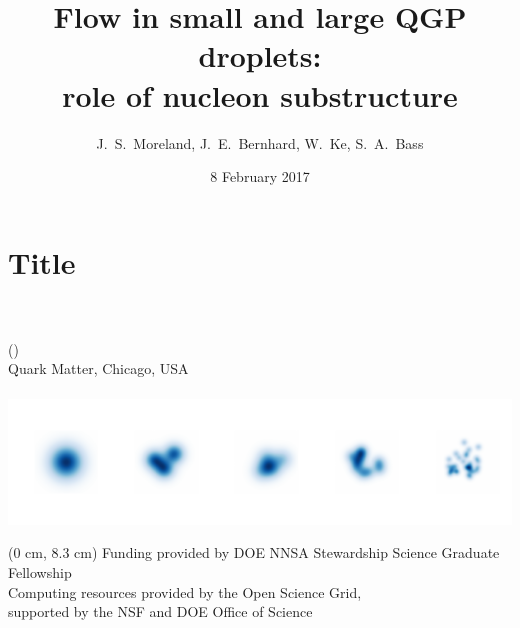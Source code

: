 \documentclass[aspectratio=43]{beamer}
\title{Flow in small and large QGP droplets:\\
role of nucleon substructure}
\author[J.\ S.\ Moreland]{
  J.\ S.\ Moreland, J.\ E.\ Bernhard, W.\ Ke, S.\ A.\ Bass}
\institute[Duke]{Duke University}
\date{8 February 2017}
\theoremstyle{definition}
\newcommand{\conference}{Quark Matter, Chicago, USA}
\begin{document}
\section{Title}

\begin{frame}
  \centering
  {\color{theme}\Large\inserttitle} \\[2ex]
  \insertauthor \\
  (\insertinstitute) \\[2ex]
  \scriptsize
  \conference \\
  \insertdate \\
  \includegraphics{title_page} \\[2ex]

  \begin{textblock*}{\paperwidth}(0 cm, 8.3 cm)
    \scriptsize Funding provided by DOE NNSA Stewardship Science Graduate Fellowship \\
    Computing resources provided by the Open Science Grid,\\
    supported by the NSF and DOE Office of Science
  \end{textblock*}
\end{frame}
\end{document}
